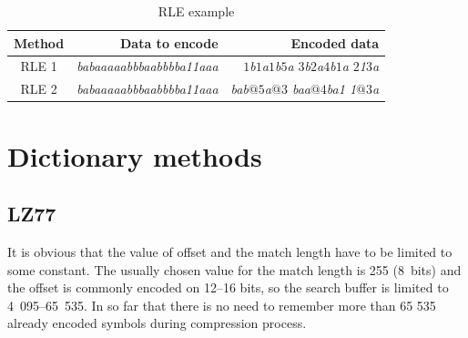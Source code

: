 \documentclass[thesis=M,english]{FITthesis}[2012/10/20]
\begin{document}
\begin{table}\centering
	\caption{RLE example}\label{tab:RLE-example}
	\begin{tabular}{|c|r|r|}
	\hline \textbf{Method} & \textbf{Data to encode} & \textbf{Encoded data} \\\hline
	RLE 1 & \textit{babaaaaabbbaabbbba11aaa} & \textit{$1$b$1$a$1$b$5$a $3$b$2$a$4$b$1$a $2$1$3$a} \\\hline
	RLE 2 & \textit{babaaaaabbbaabbbba11aaa} & \textit{bab$@5$a$@3$ baa$@4$ba1 1$@3$a} \\\hline
	\end{tabular}
\end{table}




\section{Dictionary methods}

	\subsection{LZ77}
It is obvious that the value of offset and the match length have to be limited to some constant. The usually chosen value for the match length is 255 (8~bits) and the offset is commonly encoded on 12--16 bits, so the search buffer is limited to 4~095--65~535. In so far that there is no need to remember more than 65 535 already encoded symbols during compression process.
\end{document}
